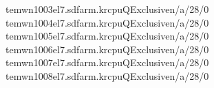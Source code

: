 \documentclass[a4paper,11pt,english]{sphinxmanual}
\begin{document}
\begin{sphinxVerbatim}[commandchars=\\\{\}]
tem\PYGZhy{}wn1003\PYGZhy{}el7.sdfarm.krcpuQExclusiven/a/28/0\PYG{o}{[}\PYG{c+c1}{\PYGZsh{}\PYGZsh{}\PYGZsh{}\PYGZsh{}\PYGZsh{}\PYGZsh{}\PYGZsh{}\PYGZsh{}\PYGZsh{}\PYGZsh{}\PYGZsh{}\PYGZsh{}\PYGZsh{}\PYGZsh{}\PYGZsh{}\PYGZsh{}\PYGZsh{}\PYGZsh{}\PYGZsh{}\PYGZsh{}\PYGZsh{}\PYGZsh{}\PYGZsh{}\PYGZsh{}\PYGZsh{}\PYGZsh{}\PYGZsh{}\PYGZsh{}]}
tem\PYGZhy{}wn1004\PYGZhy{}el7.sdfarm.krcpuQExclusiven/a/28/0\PYG{o}{[}\PYG{c+c1}{\PYGZsh{}\PYGZsh{}\PYGZsh{}\PYGZsh{}\PYGZsh{}\PYGZsh{}\PYGZsh{}\PYGZsh{}\PYGZsh{}\PYGZsh{}\PYGZsh{}\PYGZsh{}\PYGZsh{}\PYGZsh{}\PYGZsh{}\PYGZsh{}\PYGZsh{}\PYGZsh{}\PYGZsh{}\PYGZsh{}\PYGZsh{}\PYGZsh{}\PYGZsh{}\PYGZsh{}\PYGZsh{}\PYGZsh{}\PYGZsh{}\PYGZsh{}]}
tem\PYGZhy{}wn1005\PYGZhy{}el7.sdfarm.krcpuQExclusiven/a/28/0\PYG{o}{[}\PYG{c+c1}{\PYGZsh{}\PYGZsh{}\PYGZsh{}\PYGZsh{}\PYGZsh{}\PYGZsh{}\PYGZsh{}\PYGZsh{}\PYGZsh{}\PYGZsh{}\PYGZsh{}\PYGZsh{}\PYGZsh{}\PYGZsh{}\PYGZsh{}\PYGZsh{}\PYGZsh{}\PYGZsh{}\PYGZsh{}\PYGZsh{}\PYGZsh{}\PYGZsh{}\PYGZsh{}\PYGZsh{}\PYGZsh{}\PYGZsh{}\PYGZsh{}\PYGZsh{}]}
tem\PYGZhy{}wn1006\PYGZhy{}el7.sdfarm.krcpuQExclusiven/a/28/0\PYG{o}{[}\PYG{c+c1}{\PYGZsh{}\PYGZsh{}\PYGZsh{}\PYGZsh{}\PYGZsh{}\PYGZsh{}\PYGZsh{}\PYGZsh{}\PYGZsh{}\PYGZsh{}\PYGZsh{}\PYGZsh{}\PYGZsh{}\PYGZsh{}\PYGZsh{}\PYGZsh{}\PYGZsh{}\PYGZsh{}\PYGZsh{}\PYGZsh{}\PYGZsh{}\PYGZsh{}\PYGZsh{}\PYGZsh{}\PYGZsh{}\PYGZsh{}\PYGZsh{}\PYGZsh{}]}
tem\PYGZhy{}wn1007\PYGZhy{}el7.sdfarm.krcpuQExclusiven/a/28/0\PYG{o}{[}\PYG{c+c1}{\PYGZsh{}\PYGZsh{}\PYGZsh{}\PYGZsh{}\PYGZsh{}\PYGZsh{}\PYGZsh{}\PYGZsh{}\PYGZsh{}\PYGZsh{}\PYGZsh{}\PYGZsh{}\PYGZsh{}\PYGZsh{}\PYGZsh{}\PYGZsh{}\PYGZsh{}\PYGZsh{}\PYGZsh{}\PYGZsh{}\PYGZsh{}\PYGZsh{}\PYGZsh{}\PYGZsh{}\PYGZsh{}\PYGZsh{}\PYGZsh{}\PYGZsh{}]}
tem\PYGZhy{}wn1008\PYGZhy{}el7.sdfarm.krcpuQExclusiven/a/28/0\PYG{o}{[}\PYG{c+c1}{\PYGZsh{}\PYGZsh{}\PYGZsh{}\PYGZsh{}\PYGZsh{}\PYGZsh{}\PYGZsh{}\PYGZsh{}\PYGZsh{}\PYGZsh{}\PYGZsh{}\PYGZsh{}\PYGZsh{}\PYGZsh{}\PYGZsh{}\PYGZsh{}\PYGZsh{}\PYGZsh{}\PYGZsh{}\PYGZsh{}\PYGZsh{}\PYGZsh{}\PYGZsh{}\PYGZsh{}\PYGZsh{}\PYGZsh{}\PYGZsh{}\PYGZsh{}]}

\end{sphinxVerbatim}
\end{document}
